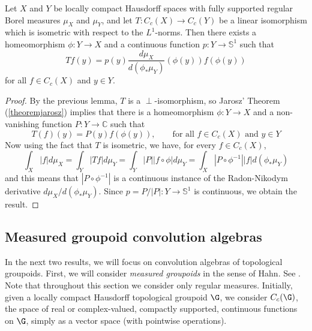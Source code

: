 \begin{theorem}\label{theoremdisjointnessl1}
Let $X$ and $Y$ be locally compact Hausdorff spaces with fully supported regular Borel measures $\mu_X$ and $\mu_Y$, and let $T:C_c(X)\to C_c(Y)$ be a linear isomorphism which is isometric with respect to the $L^1$-norms. Then there exists a homeomorphism $\phi:Y\to X$ and a continuous function $p:Y\to\mathbb{S}^1$ such that
\[Tf(y)=p(y)\frac{d\mu_X}{d(\phi_*\mu_Y)}(\phi(y))f(\phi(y))\]
for all $f\in C_c(X)$ and $y\in Y$.
\end{theorem}
\begin{proof}
By the previous lemma, $T$ is a $\perp$-isomorphism, so Jarosz' Theorem (\ref{theoremjarosz}) implies that there is a homeomorphism $\phi:Y\to X$ and a non-vanishing function $P:Y\to\mathbb{C}$ such that
\[T(f)(y)=P(y)f(\phi(y)),\qquad\text{for all }f\in C_c(X)\text{ and }y\in Y\]
Now using the fact that $T$ is isometric, we have, for every $f\in C_c(X)$,
\[\int_X|f|d\mu_X=\int_Y|Tf|d\mu_Y=\int_Y|P||f\circ\phi|d\mu_Y=\int_X|P\circ\phi^{-1}||f|d(\phi_*\mu_Y)\]
and this means that $|P\circ\phi^{-1}|$ is a continuous instance of the Radon-Nikodym derivative $d\mu_X/d(\phi_*\mu_Y)$. Since $p=P/|P|:Y\to\mathbb{S}^1$ is continuous, we obtain the result.\qedhere
\end{proof}

\subsection{Measured groupoid convolution algebras}\label{subsectionwendelstheorem}

In the next two results, we will focus on convolution algebras of topological groupoids. First, we will consider \emph{measured groupoids} in the sense of Hahn. See \cite{MR496796,MR496797,MR584266,MR1444088,MR0427598}. Note that throughout this section we consider only regular measures. Initially, given a locally compact Hausdorff topological groupoid $\G$, we consider $C_c(\G)$, the space of real or complex-valued, compactly supported, continuous functions on $\G$, simply as a vector space (with pointwise operations).

